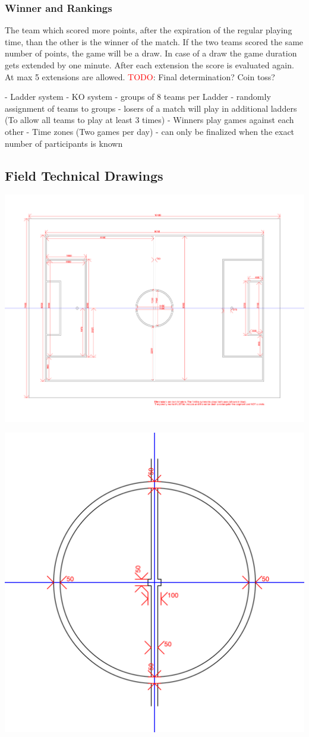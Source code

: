 \subsubsection{Winner and Rankings}
\label{sec:rankings}

The team which scored more points, after the expiration of the regular playing time, than the other is the winner of the match. If the two teams scored the same number of points, the game will be a draw. In case of a draw the game duration gets extended by one minute. After each extension the score is evaluated again. At max 5 extensions are allowed. 
\textcolor{red}{TODO}: Final determination? Coin toss?


- Ladder system
- KO system 
- groups of 8 teams per Ladder
- randomly assignment of teams to groups
- losers of a match will play in additional ladders (To allow all teams to play at least 3 times)
- Winners play games against each other
- Time zones (Two games per day)
- can only be finalized when the exact number of participants is known
    
\newpage

\subsection{Field Technical Drawings}
\label{apx:technical-drawing}
\centerline{\includegraphics[angle=90,origin=c,width=\columnwidth]{figs/fieldDimensions2020_technical.pdf}}

\clearpage
\centerline{\includegraphics[angle=90,origin=c,width=0.5\columnwidth]{figs/fieldDimensions2020_technical_cc.pdf}}

